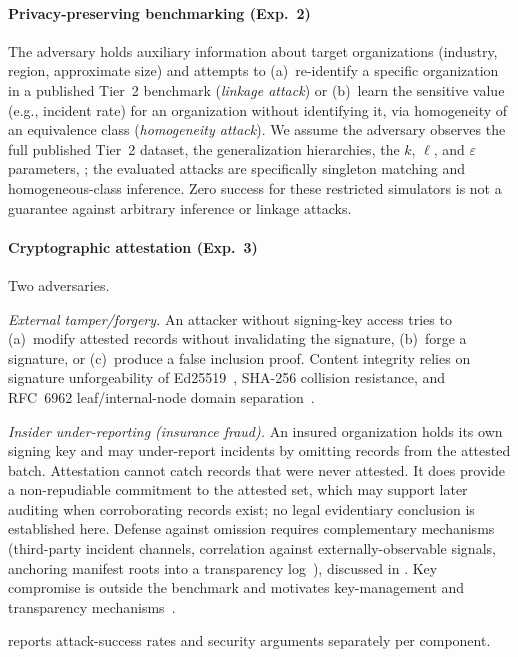 \paragraph{Privacy-preserving benchmarking (Exp.~2)} The adversary holds auxiliary information about target organizations (industry, region, approximate size) and attempts to (a)~re-identify a specific organization in a published Tier~2 benchmark (\emph{linkage attack}) or (b)~learn the sensitive value (e.g., incident rate) for an organization without identifying it, via homogeneity of an equivalence class (\emph{homogeneity attack}). We assume the adversary observes the full published Tier~2 dataset, the generalization hierarchies, the $k$, $\ell$, and $\varepsilon$ parameters, ; the evaluated attacks are specifically singleton matching and homogeneous-class inference. Zero success for these restricted simulators is not a guarantee against arbitrary inference or linkage attacks.

\paragraph{Cryptographic attestation (Exp.~3)} Two adversaries.

\emph{External tamper/forgery.} An attacker without signing-key access tries to (a)~modify attested records without invalidating the signature, (b)~forge a signature, or (c)~produce a false inclusion proof. Content integrity relies on signature unforgeability of Ed25519~\cite{bernstein_2012_ed25519}, SHA-256 collision resistance, and RFC~6962 leaf/internal-node domain separation~\cite{laurie_2013_rfc6962}.

\emph{Insider under-reporting (insurance fraud).} An insured organization holds its own signing key and may under-report incidents by omitting records from the attested batch. Attestation cannot catch records that were never attested. It does provide a non-repudiable commitment to the attested set, which may support later auditing when corroborating records exist; no legal evidentiary conclusion is established here. Defense against omission requires complementary mechanisms (third-party incident channels, correlation against externally-observable signals, anchoring manifest roots into a transparency log~\cite{newman_2022_sigstore}), discussed in . Key compromise is outside the benchmark and motivates key-management and transparency mechanisms~\cite{laurie_2013_rfc6962}.

 reports attack-success rates and security arguments separately per component.

